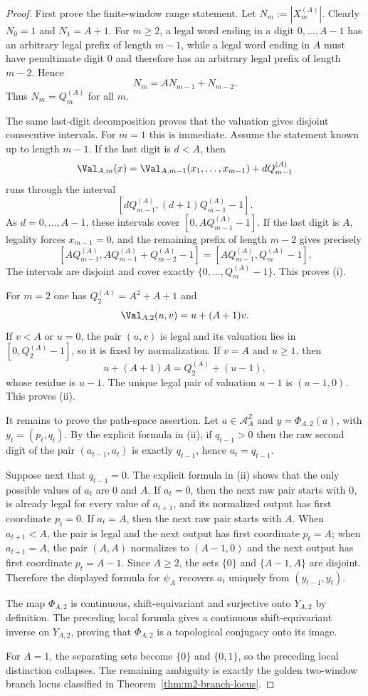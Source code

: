 \begin{proof}
First prove the finite-window range statement.  Let $N_m:=|X_m^{(A)}|$.
Clearly $N_0=1$ and $N_1=A+1$.  For $m\ge2$, a legal word ending in a digit
$0,\ldots,A-1$ has an arbitrary legal prefix of length $m-1$, while a legal
word ending in $A$ must have penultimate digit $0$ and therefore has an
arbitrary legal prefix of length $m-2$.  Hence
\[
N_m=A N_{m-1}+N_{m-2}.
\]
Thus $N_m=Q_m^{(A)}$ for all $m$.

The same last-digit decomposition proves that the valuation gives disjoint
consecutive intervals. For $m=1$ this is immediate. Assume the statement
known up to length $m-1$. If the last digit is $d<A$, then
\[
\Val_{A,m}(x)=\Val_{A,m-1}(x_1,\ldots,x_{m-1})+dQ_{m-1}^{(A)}
\]
runs through the interval
\[
[dQ_{m-1}^{(A)},(d+1)Q_{m-1}^{(A)}-1].
\]
As $d=0,\ldots,A-1$, these intervals cover
$[0,AQ_{m-1}^{(A)}-1]$. If the last digit is $A$, legality forces
$x_{m-1}=0$, and the remaining prefix of length $m-2$ gives precisely
\[
[AQ_{m-1}^{(A)},AQ_{m-1}^{(A)}+Q_{m-2}^{(A)}-1]
=[AQ_{m-1}^{(A)},Q_m^{(A)}-1].
\]
The intervals are disjoint and cover exactly
$\{0,\ldots,Q_m^{(A)}-1\}$.  This proves (i).

For $m=2$ one has $Q_2^{(A)}=A^2+A+1$ and
\[
\Val_{A,2}(u,v)=u+(A+1)v.
\]
If $v<A$ or $u=0$, the pair $(u,v)$ is legal and its valuation lies in
$[0,Q_2^{(A)}-1]$, so it is fixed by normalization.  If $v=A$ and $u\ge1$,
then
\[
u+(A+1)A=Q_2^{(A)}+(u-1),
\]
whose residue is $u-1$.  The unique legal pair of valuation $u-1$ is
$(u-1,0)$.  This proves (ii).

It remains to prove the path-space assertion. Let
$a\in\mathcal A_A^{\mathbb Z}$ and $y=\Phi_{A,2}(a)$, with
$y_t=(p_t,q_t)$.  By the explicit formula in (ii), if $q_{t-1}>0$ then the
raw second digit of the pair $(a_{t-1},a_t)$ is exactly $q_{t-1}$, hence
$a_t=q_{t-1}$.

Suppose next that $q_{t-1}=0$.  The explicit formula in (ii) shows that the
only possible values of $a_t$ are $0$ and $A$.  If $a_t=0$, then the next raw
pair starts with $0$, is already legal for every value of $a_{t+1}$, and its
normalized output has first coordinate $p_t=0$.  If $a_t=A$, then the next raw
pair starts with $A$.  When $a_{t+1}<A$, the pair is legal and the next output
has first coordinate $p_t=A$; when $a_{t+1}=A$, the pair $(A,A)$ normalizes to
$(A-1,0)$ and the next output has first coordinate $p_t=A-1$.  Since
$A\ge2$, the sets $\{0\}$ and $\{A-1,A\}$ are disjoint.  Therefore the displayed
formula for $\psi_A$ recovers $a_t$ uniquely from $(y_{t-1},y_t)$.

The map $\Phi_{A,2}$ is continuous, shift-equivariant and surjective onto
$Y_{A,2}$ by definition. The preceding local formula gives a continuous
shift-equivariant inverse on $Y_{A,2}$, proving that $\Phi_{A,2}$ is a
topological conjugacy onto its image.

For $A=1$, the separating sets become $\{0\}$ and $\{0,1\}$, so the preceding
local distinction collapses. The remaining ambiguity is exactly the golden
two-window branch locus classified in Theorem~\ref{thm:m2-branch-locus}.
\end{proof}

